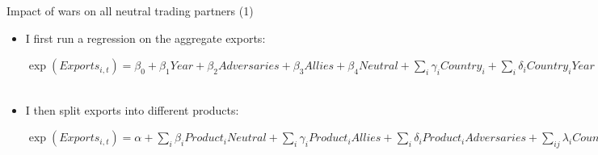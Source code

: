 \documentclass[11pt]{beamer}
\begin{document}
\begin{frame}{Impact of wars on all neutral trading partners (1)}
\begin{itemize}
\item{I first run a regression on the aggregate exports:
\begin{center}
$\exp(Exports_{i,t})=\beta_0+\beta_1Year+\beta_2Adversaries+ \beta_3Allies+ \beta_4Neutral+ \sum_{i}\gamma_iCountry_i+\sum_{i}\delta_iCountry_iYear$\\~\\
\end{center} }
\item{I then split exports into  different products:
\begin{center}
$\exp(Exports_{i,t})=\alpha+ \sum_{i}\beta_{i}Product_iNeutral +\sum_i \gamma_iProduct_iAllies +\sum_i\delta_iProduct_iAdversaries + \sum_{ij}\lambda_iCountry_iProduct_j+\sum_{i}\theta_iCountry_iYear+ \sum_{i}\phi_iProduct_iYear$
\end{center}}
\end{itemize}
\end{frame}
\end{document}
